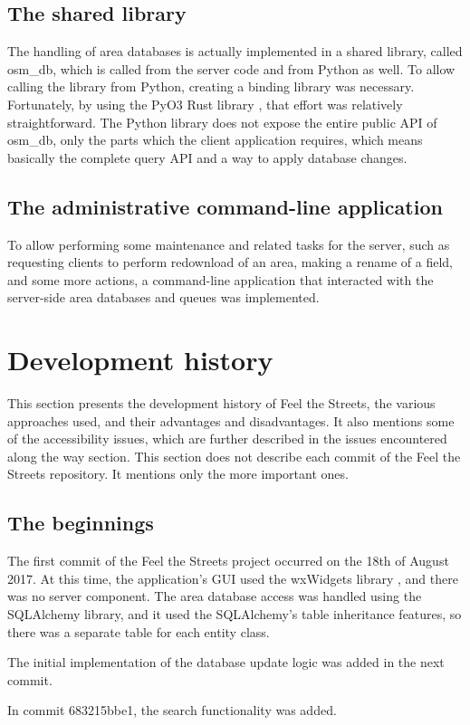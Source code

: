 \documentclass[nolof,digital]{fithesis3}
\begin{document}
\subsection{The shared library}
The handling of area databases is actually implemented in a shared library, called osm\_db, which is called from the server code and from Python as well. To allow calling the library from Python, creating a binding library was necessary. Fortunately, by using the PyO3 Rust library \parencite{pyo3}, that effort was relatively straightforward. The Python library does not expose the entire public API of osm\_db, only the parts which the client application requires, which means basically the complete query API and a way to apply database changes.
\subsection{The administrative command-line application}
To allow performing some maintenance and related tasks for the server, such as requesting clients to perform redownload of an area, making a rename of a field, and some more actions, a command-line application that interacted with the server-side area databases and queues was implemented.
\section{Development history} \label{ref:devhistory}
This section presents the development history of Feel the Streets, the various approaches used, and their advantages and disadvantages. It also mentions some of the accessibility issues, which are further described in the issues encountered along the way section. This section does not describe each commit of the Feel the Streets repository. It mentions only the more important ones.
\subsection{The beginnings}
The first commit of the Feel the Streets project occurred on the 18th of August 2017. At this time, the application's GUI used the wxWidgets library \parencite{wx}, and there was no server component. The area database access was handled using the SQLAlchemy library, and it used the SQLAlchemy's table inheritance features, so there was a separate table for each entity class.

The initial implementation of the database update logic was added in the next commit.

In commit 683215bbe1, the search functionality was added.
\end{document}
